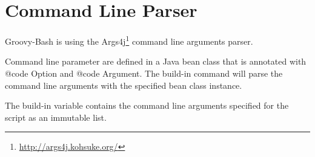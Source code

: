 \section{Command Line Parser}

Groovy-Bash is using the
Args4j\footnote{\url{http://args4j.kohsuke.org/}} command line arguments parser.

Command line parameter are defined in a Java bean class that is annotated
with {@code Option} and {@code Argument}. The build-in
command  will parse the command line arguments with the
specified bean class instance.

The build-in variable  contains
the command line arguments specified for the script as an immutable list.

